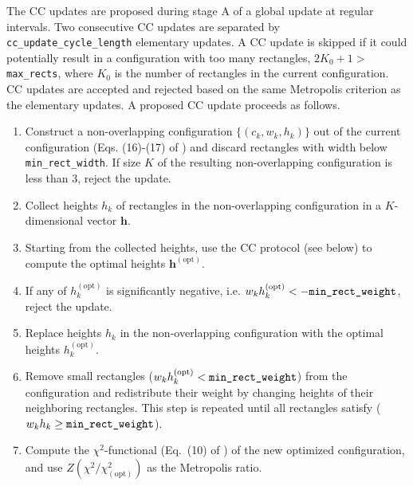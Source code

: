 \documentclass[]{article}
\begin{document}
The CC updates are proposed during stage A of a global update at regular intervals. Two consecutive CC updates are separated by \verb|cc_update_cycle_length| elementary updates. A CC update is skipped if it could potentially result in a configuration with too many rectangles, $2K_0+1>$ \verb|max_rects|, where $K_0$ is the number of rectangles in the current configuration.
CC updates are accepted and rejected based on the same Metropolis criterion as the elementary updates.
A proposed CC update proceeds as follows.
\begin{enumerate}
    \item Construct a non-overlapping configuration $\{(c_k, w_k, h_k)\}$ out of the current  configuration (Eqs. (16)-(17) of \cite{socc_paper}) and discard rectangles with width below \verb|min_rect_width|. If size $K$ of the resulting non-overlapping configuration is less than 3, reject the update.

    \item Collect heights $h_k$ of rectangles in the non-overlapping configuration in a $K$-dimensional vector $\mathbf{h}$.

    \item Starting from the collected heights, use the CC protocol (see below) to compute the optimal heights $\mathbf{h}^\mathrm{(opt)}$.

    \item If any of $h^\mathrm{(opt)}_k$ is significantly negative, i.e. $w_k h^\mathrm{(opt)}_k < -\verb|min_rect_weight|$, reject the update.

    \item Replace heights $h_k$ in the non-overlapping configuration with the optimal heights $h^\mathrm{(opt)}_k$.

    \item Remove small rectangles ($w_k h^\mathrm{(opt)}_k < \verb|min_rect_weight|$) from the configuration and redistribute their weight by changing heights of their neighboring rectangles. This step is repeated until all rectangles satisfy ($w_k h_k \geq \verb|min_rect_weight|$).

    \item Compute the $\chi^2$-functional (Eq.~(10) of \cite{socc_paper}) of the new optimized configuration, and use $Z(\chi^2 /\chi^2_\mathrm{(opt)})$ as the Metropolis ratio.
\end{enumerate}
\end{document}
